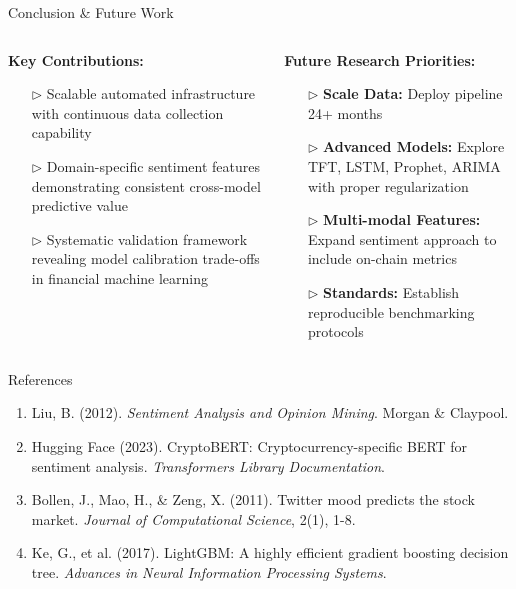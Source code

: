 \documentclass[final]{beamer}
\begin{document}
\begin{frame}[t]
\begin{block}{Conclusion \& Future Work}
    \small
    \begin{columns}[T]
    \begin{column}{0.58\linewidth}
        \textbf{Key Contributions:}
        \begin{itemize}\small
            \item[$\triangleright$] Scalable automated infrastructure with continuous data collection capability
            \item[$\triangleright$] Domain-specific sentiment features demonstrating consistent cross-model predictive value
            \item[$\triangleright$] Systematic validation framework revealing model calibration trade-offs in financial machine learning
        \end{itemize}
    \end{column}
    \begin{column}{0.4\linewidth}
        \textbf{Future Research Priorities:}
        \begin{itemize}\small
            \item[$\triangleright$] \textbf{Scale Data:} Deploy pipeline 24+ months
            \item[$\triangleright$] \textbf{Advanced Models:} Explore TFT, LSTM, Prophet, ARIMA with proper regularization
            \item[$\triangleright$] \textbf{Multi-modal Features:} Expand sentiment approach to include on-chain metrics
            \item[$\triangleright$] \textbf{Standards:} Establish reproducible benchmarking protocols
        \end{itemize}
    \end{column}
    \end{columns}
\end{block}

\begin{columns}[T]
\begin{column}{0.75\linewidth}
\begin{block}{References}
    \small
    \begin{enumerate}\small
        \item Liu, B. (2012). \textit{Sentiment Analysis and Opinion Mining}. Morgan \& Claypool.
        \item Hugging Face (2023). CryptoBERT: Cryptocurrency-specific BERT for sentiment analysis. \textit{Transformers Library Documentation}.
        \item Bollen, J., Mao, H., \& Zeng, X. (2011). Twitter mood predicts the stock market. \textit{Journal of Computational Science}, 2(1), 1-8.
        \item Ke, G., et al. (2017). LightGBM: A highly efficient gradient boosting decision tree. \textit{Advances in Neural Information Processing Systems}.
    \end{enumerate}
\end{block}
\end{column}


\end{columns}
\end{frame}
\end{document}
